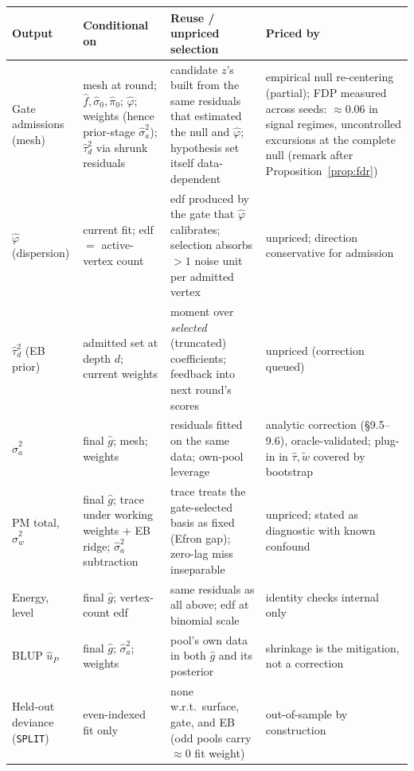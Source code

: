 \documentclass[11pt]{article}
\begin{document}
\medskip
\begin{center}
\small
\begin{tabular}{@{}p{2.6cm}p{4.2cm}p{4.6cm}p{3.2cm}@{}}
\toprule
\textbf{Output} & \textbf{Conditional on} & \textbf{Reuse / unpriced selection} & \textbf{Priced by} \\
\midrule
Gate admissions (mesh) & mesh at round; $\hat f,\hat\sigma_0,\hat\pi_0$;
$\hat\varphi$; weights (hence prior-stage $\hat\sigma_a^2$); $\hat\tau_d^2$
via shrunk residuals & candidate $z$'s built from the same residuals that
estimated the null and $\hat\varphi$; hypothesis set itself data-dependent &
empirical null re-centering (partial); FDP measured across seeds: $\approx0.06$ in signal regimes, uncontrolled excursions at the complete null (remark after Proposition~\ref{prop:fdr}) \\
\addlinespace
$\hat\varphi$ (dispersion) & current fit; edf $=$ active-vertex count &
edf produced by the gate that $\hat\varphi$ calibrates; selection absorbs
$>1$ noise unit per admitted vertex & unpriced; direction conservative for
admission \\
\addlinespace
$\hat\tau_d^2$ (EB prior) & admitted set at depth $d$; current weights &
moment over \emph{selected} (truncated) coefficients; feedback into next
round's scores & unpriced (correction queued) \\
\addlinespace
$\hat\sigma_a^2$ & final $\hat g$; mesh; weights & residuals fitted on the
same data; own-pool leverage & analytic correction (\S9.5--9.6), oracle-validated;
plug-in in $\hat\tau,\tilde w$ covered by bootstrap \\
\addlinespace
PM total, $\hat\sigma_w^2$ & final $\hat g$; trace under working weights
$+$ EB ridge; $\hat\sigma_a^2$ subtraction & trace treats the gate-selected
basis as fixed (Efron gap); zero-lag miss inseparable & unpriced; stated as
diagnostic with known confound \\
\addlinespace
Energy, level & final $\hat g$; vertex-count edf & same residuals as all
above; edf at binomial scale & identity checks internal only \\
\addlinespace
BLUP $\hat u_P$ & final $\hat g$; $\hat\sigma_a^2$; weights & pool's own
data in both $\hat g$ and its posterior & shrinkage is the mitigation, not
a correction \\
\addlinespace
Held-out deviance (\texttt{SPLIT}) & even-indexed fit only & none w.r.t.\
surface, gate, and EB (odd pools carry $\approx0$ fit weight) & out-of-sample
by construction \\
\bottomrule
\end{tabular}
\end{center}
\end{document}
